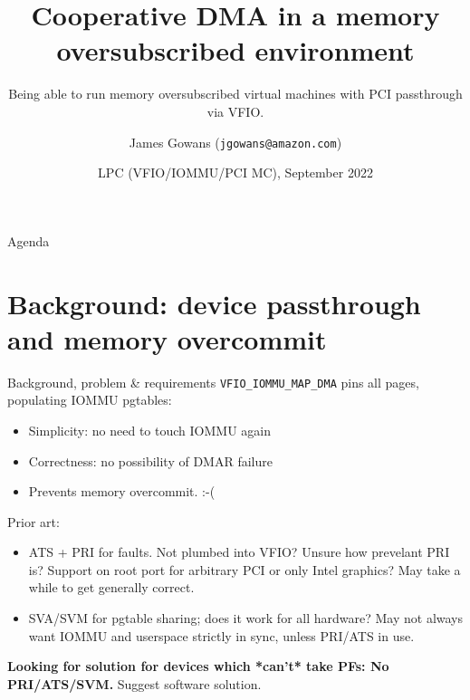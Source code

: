 \documentclass{beamer}
\title{Cooperative DMA in a memory oversubscribed environment}
\subtitle{Being able to run memory oversubscribed virtual machines with PCI passthrough via VFIO.}
\author[James Gowans (EC2) ]{James Gowans (\texttt{jgowans@amazon.com})}
\institute{Amazon / AWS / EC2}
\date{LPC (VFIO/IOMMU/PCI MC), September 2022}
\begin{document}
\begin{frame}
\titlepage
\end{frame}


\begin{frame}{Agenda}
  \tableofcontents[hideallsubsections]
\end{frame}


\section{Background: device passthrough and memory overcommit}
\begin{frame}{Background, problem \& requirements}
  \texttt{VFIO\_IOMMU\_MAP\_DMA} pins all pages, populating IOMMU pgtables:
  \begin{itemize}
    \item Simplicity: no need to touch IOMMU again
    \item Correctness: no possibility of DMAR failure
    \item Prevents memory overcommit. :-(
  \end{itemize}
  Prior art:
  \begin{itemize}
    \item ATS + PRI for faults. Not plumbed into VFIO? Unsure how prevelant PRI is? Support on root port for arbitrary PCI or only Intel graphics? May take a while to get generally correct.
    \item SVA/SVM for pgtable sharing; does it work for all hardware? May not always want IOMMU and userspace strictly in sync, unless PRI/ATS in use.
  \end{itemize}
  \textbf{Looking for solution for devices which *can't* take PFs: No PRI/ATS/SVM.}
  Suggest software solution.
\end{frame}
\end{document}
